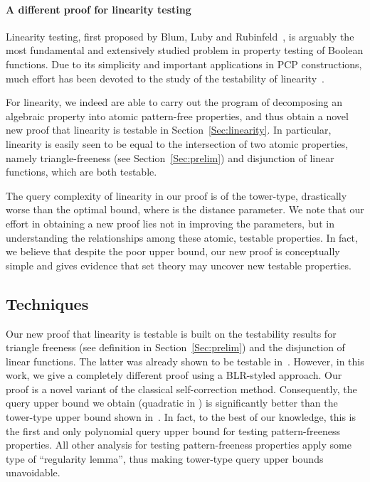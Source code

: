 \documentclass[11pt,english]{article}
\theoremstyle{definition}
\theoremstyle{remark}
\begin{document}
\paragraph{A different proof for linearity testing}
Linearity testing, first proposed by Blum, Luby and Rubinfeld~\cite{BLR93},
is arguably the most fundamental and extensively studied problem in
property testing of Boolean functions. Due to its simplicity and important
applications in PCP constructions, much effort has been devoted to
the study of the testability of linearity~\cite{BLR93,BGLR93,BGS98,BCHKS96,Kiw03}.

For linearity, we indeed are able to carry out the program of decomposing
an algebraic property into atomic pattern-free properties, and thus
obtain a novel new proof that linearity is testable in Section~\ref{Sec:linearity}.
In particular, linearity is easily seen to be equal to the intersection
of two atomic properties, namely triangle-freeness (see Section~\ref{Sec:prelim})
and disjunction of linear functions, which are both testable. 

The query complexity of linearity in our proof is of the tower-type,
drastically worse than the optimal  bound, where 
is the distance parameter. 
We note that our effort in obtaining a new proof lies not in improving the parameters, 
but in understanding
the relationships among these atomic, testable properties. 
In fact, we believe that despite the poor upper bound, our new proof is conceptually
simple and gives evidence that set theory may uncover new testable
properties. 


\subsection{Techniques}

Our new proof that linearity is testable is built on the testability
results for triangle freeness (see definition in Section~\ref{Sec:prelim})
and the disjunction of linear functions. 
The latter was already shown to be testable in~\cite{BCSX09}.
However, in this work, we give a completely different proof using a BLR-styled approach. 
Our proof is a novel variant of the classical self-correction method. 
Consequently, the query upper bound we obtain (quadratic in ) is significantly
better than the tower-type upper bound shown in~\cite{BCSX09}. 
In fact, to the best of our knowledge, this is the first and only polynomial query 
upper bound for testing pattern-freeness properties. 
All other analysis for testing pattern-freeness properties apply some type of ``regularity lemma'', 
thus making tower-type query upper bounds unavoidable. 
\end{document}
